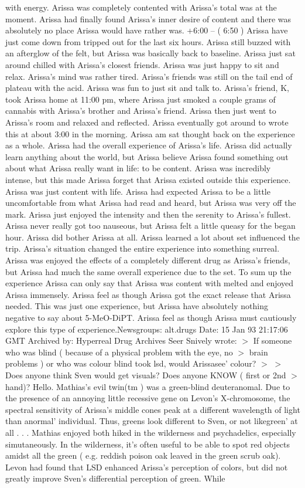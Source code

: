 \documentclass[12pt]{book}
\begin{document}
with energy. Arissa was completely contented with Arissa's total was at the moment. Arissa had finally found Arissa's inner desire of content and there was absolutely no place Arissa would have rather was. +6:00 -- ( 6:50 ) Arissa have just come down from tripped out for the last six hours. Arissa still buzzed with an afterglow of the felt, but Arissa was basically back to baseline. Arissa just sat around chilled with Arissa's closest friends. Arissa was just happy to sit and relax. Arissa's mind was rather tired. Arissa's friends was still on the tail end of plateau with the acid. Arissa was fun to just sit and talk to. Arissa's friend, K, took Arissa home at 11:00 pm, where Arissa just smoked a couple grams of cannabis with Arissa's brother and Arissa's friend. Arissa then just went to Arissa's room and relaxed and reflected. Arissa eventually got around to wrote this at about 3:00 in the morning. Arissa am sat thought back on the experience as a whole. Arissa had the overall experience of Arissa's life. Arissa did actually learn anything about the world, but Arissa believe Arissa found something out about what Arissa really want in life: to be content. Arissa was incredibly intense, but this made Arissa forget that Arissa existed outside this experience. Arissa was just content with life. Arissa had expected Arissa to be a little uncomfortable from what Arissa had read and heard, but Arissa was very off the mark. Arissa just enjoyed the intensity and then the serenity to Arissa's fullest. Arissa never really got too nauseous, but Arissa felt a little queasy for the began hour. Arissa did bother Arissa at all. Arissa learned a lot about set influenced the trip. Arissa's situation changed the entire experience into something surreal. Arissa was enjoyed the effects of a completely different drug as Arissa's friends, but Arissa had much the same overall experience due to the set. To sum up the experience Arissa can only say that Arissa was content with melted and enjoyed Arissa immensely. Arissa feel as though Arissa got the exact release that Arissa needed. This was just one experience, but Arissa have absolutely nothing negative to say about 5-MeO-DiPT. Arissa feel as though Arissa must cautiously explore this type of experience.Newsgroups: alt.drugs Date: 15 Jan 93 21:17:06 GMT Archived by: Hyperreal Drug Archives Seer Snively wrote: $>$ If someone who was blind ( because of a physical problem with the eye, no $>$ brain problems ) or who was colour blind took lsd, would Arissasee' colour? $>$ $>$ Does anyone think Sven would get visuals? Does anyone KNOW ( first or 2nd $>$ hand)? Hello. Mathias's evil twin(tm ) was a green-blind deuteranomal. Due to the presence of an annoying little recessive gene on Levon's X-chromosome, the spectral sensitivity of Arissa's middle cones peak at a different wavelength of light than anormal' individual. Thus, greens look different to Sven, or not likegreen' at all . . .  Mathias enjoyed both hiked in the wilderness and psychadelics, especially simutaneously. In the wilderness, it's often useful to be able to spot red objects amidst all the green ( e.g. reddish poison oak leaved in the green scrub oak). Levon had found that LSD enhanced Arissa's perception of colors, but did not greatly improve Sven's differential perception of green. While 
\end{document}
